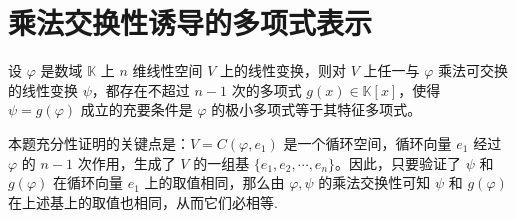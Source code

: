 \documentclass[../../main.tex]{subfiles}
\begin{document}
\section{乘法交换性诱导的多项式表示}

\begin{theorem}\label{theorem:极小多项式等于特征多项式的充要条件}
设 $\varphi$ 是数域 $\mathbb{K}$ 上 $n$ 维线性空间 $V$ 上的线性变换，则对 $V$ 上任一与 $\varphi$ 乘法可交换的线性变换 $\psi$，都存在不超过 $n - 1$ 次的多项式 $g(x)\in\mathbb{K}[x]$，使得 $\psi = g(\varphi)$ 成立的充要条件是 $\varphi$ 的极小多项式等于其特征多项式。
\end{theorem}
\begin{remark}
本题充分性证明的关键点是：$V = C(\varphi,e_1)$ 是一个循环空间，循环向量 $e_1$ 经过 $\varphi$ 的 $n - 1$ 次作用，生成了 $V$ 的一组基 $\{e_1,e_2,\cdots,e_n\}$。因此，只要验证了 $\psi$ 和 $g(\varphi)$ 在循环向量 $e_1$ 上的取值相同，那么由 $\varphi,\psi$ 的乘法交换性可知 $\psi$ 和 $g(\varphi)$ 在上述基上的取值也相同，从而它们必相等.
\end{remark}
\end{document}
